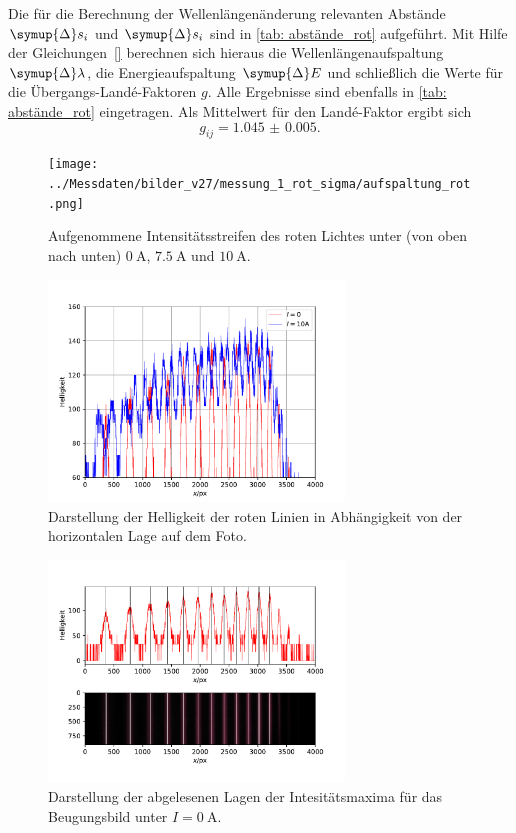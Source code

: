 Die für die Berechnung der Wellenlängenänderung relevanten Abstände $\symup{\Delta} s_i$ und $\symup{\Delta} s_i$ sind in \autoref{tab: abstände_rot}
aufgeführt. Mit Hilfe der Gleichungen~\eqref{} berechnen sich hieraus die Wellenlängenaufspaltung $\symup{\Delta} \lambda$, die
Energieaufspaltung $\symup{\Delta} E$ und schließlich die Werte für die Übergangs-Landé-Faktoren $g$. Alle Ergebnisse sind ebenfalls in
\autoref{tab: abstände_rot} eingetragen. Als Mittelwert für den Landé-Faktor ergibt sich
\begin{equation}
  g_{ij} = \num{1.045(5)}.
\end{equation}
\begin{figure}
  \centering
  \texttt{[image: ../Messdaten/bilder\_v27/messung\_1\_rot\_sigma/aufspaltung\_rot.png]}
  \caption{Aufgenommene Intensitätsstreifen des roten Lichtes unter (von oben nach unten) $\SI{0}{\ampere}$, $\SI{7.5}{\ampere}$ und $\SI{10}{\ampere}$.}
  \label{fig: aufspaltung_rot}
\end{figure}
\begin{figure}
  \centering
  \includegraphics[width = 0.7\textwidth]{../Messdaten/plots/rot_sigma_intensitaet.pdf}
  \caption{Darstellung der Helligkeit der roten Linien in Abhängigkeit von der horizontalen Lage auf dem Foto.}
  \label{fig: rot_intensität}
\end{figure}

\begin{figure}
  \centering
  \includegraphics[width = 0.7\textwidth]{../Messdaten/plots/peaks_rot_sigma_0.pdf}
  \caption{Darstellung der abgelesenen Lagen der Intesitätsmaxima für das Beugungsbild unter $I =\SI{0}{\ampere}$.}
  \label{fig: peaks_rot_0}
\end{figure}
